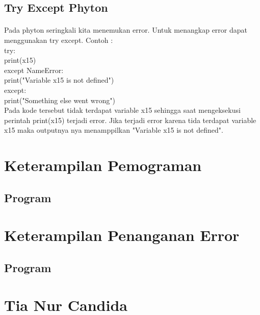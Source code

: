  \subsection{Try Except Phyton}
\paragraph{}
Pada phyton seringkali kita menemukan error. Untuk menangkap error dapat menggunakan try except. Contoh :\\

try:\\
  print(x15)\\
except NameError:\\
  print("Variable x15 is not defined")\\
except:\\
  print("Something else went wrong")\\
  
Pada kode tersebut tidak terdapat variable x15 sehingga saat mengeksekusi perintah print(x15) terjadi error. Jika terjadi error karena tida terdapat variable x15 maka outputnya nya menamppilkan "Variable x15 is not defined".

\section{Keterampilan Pemograman}
\subsection{Program}


\section{Keterampilan Penanganan Error}
\subsection{Program}


\section{Tia Nur Candida}
